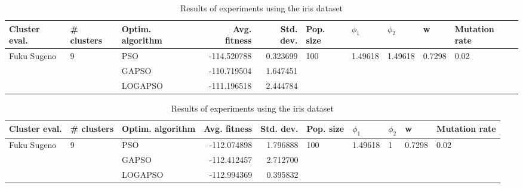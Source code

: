 \documentclass{article}
\begin{document}
\begin{table}
\centering
\caption{Results of experiments using the iris dataset}
\begin{tabular}{lllrrlllll}
\toprule
               Cluster eval. &        \# clusters & Optim. algorithm &  Avg. fitness &  Std. dev. &            Pop. size &               $\phi_{1}$ &               $\phi_{2}$ &                       w &         Mutation rate \\
\midrule
\multirow{3}{*}{Fuku Sugeno} & \multirow{3}{*}{9} &              PSO &   -114.520788 &   0.323699 & \multirow{3}{*}{100} & \multirow{3}{*}{1.49618} & \multirow{3}{*}{1.49618} & \multirow{3}{*}{0.7298} & \multirow{3}{*}{0.02} \\
                             &                    &            GAPSO &   -110.719504 &   1.647451 &                      &                          &                          &                         &                       \\
                             &                    &          LOGAPSO &   -111.196518 &   2.444784 &                      &                          &                          &                         &                       \\
\bottomrule
\end{tabular}
\end{table}
\begin{table}
\centering
\caption{Results of experiments using the iris dataset}
\begin{tabular}{lllrrlllll}
\toprule
               Cluster eval. &        \# clusters & Optim. algorithm &  Avg. fitness &  Std. dev. &            Pop. size &               $\phi_{1}$ &         $\phi_{2}$ &                       w &         Mutation rate \\
\midrule
\multirow{3}{*}{Fuku Sugeno} & \multirow{3}{*}{9} &              PSO &   -112.074898 &   1.796888 & \multirow{3}{*}{100} & \multirow{3}{*}{1.49618} & \multirow{3}{*}{1} & \multirow{3}{*}{0.7298} & \multirow{3}{*}{0.02} \\
                             &                    &            GAPSO &   -112.412457 &   2.712700 &                      &                          &                    &                         &                       \\
                             &                    &          LOGAPSO &   -112.994369 &   0.395832 &                      &                          &                    &                         &                       \\
\bottomrule
\end{tabular}
\end{table}
\end{document}
